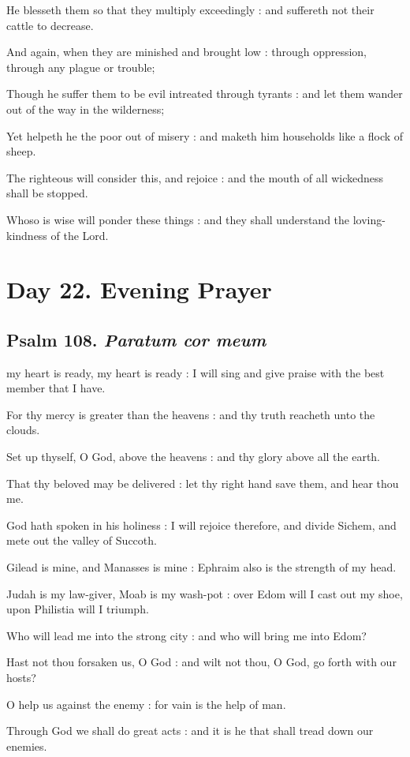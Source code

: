He blesseth them so that they multiply exceedingly : and suffereth not their cattle to decrease.\par
{}And again, when they are minished and brought low : through oppression, through any plague or trouble;\par
{}Though he suffer them to be evil intreated through tyrants : and let them wander out of the way in the wilderness;\par
{}Yet helpeth he the poor out of misery : and maketh him households like a flock of sheep.\par
{}The righteous will consider this, and rejoice : and the mouth of all wickedness shall be stopped.\par
{}Whoso is wise will ponder these things : and they shall understand the loving-kindness of the Lord.\par


\clearpage
\section*{Day 22. Evening Prayer}

\subsection{Psalm 108. \textit{Paratum cor meum}}

 my heart is ready, my heart is ready : I will sing and give praise with the best member that I have.\par
{}
For thy mercy is greater than the heavens : and thy truth reacheth unto the clouds.\par
{}Set up thyself, O God, above the heavens : and thy glory above all the earth.\par
{}That thy beloved may be delivered : let thy right hand save them, and hear thou me.\par
{}God hath spoken in his holiness : I will rejoice therefore, and divide Sichem, and mete out the valley of Succoth.\par
{}Gilead is mine, and Manasses is mine : Ephraim also is the strength of my head.\par
{}Judah is my law-giver, Moab is my wash-pot : over Edom will I cast out my shoe, upon Philistia will I triumph.\par
{}Who will lead me into the strong city : and who will bring me into Edom?\par
{}Hast not thou forsaken us, O God : and wilt not thou, O God, go forth with our hosts?\par
{}O help us against the enemy : for vain is the help of man.\par
{}Through God we shall do great acts : and it is he that shall tread down our enemies.\par

